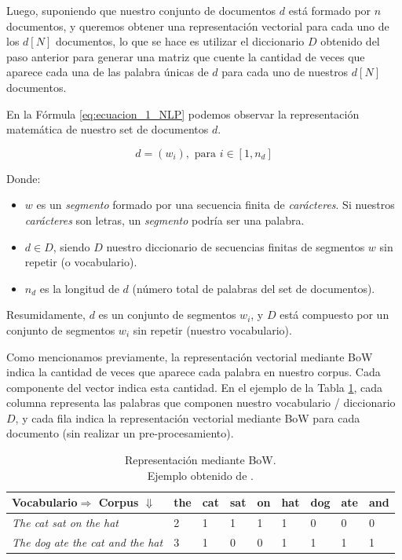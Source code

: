 \documentclass[12pt,a4paper]{article}
\begin{document}
\begin{sloppypar}
Luego, suponiendo que nuestro conjunto de documentos $d$ está formado por $n$ documentos, y queremos obtener una representación vectorial para cada uno de los $d[N]$ documentos, lo que se hace es utilizar el diccionario $D$ obtenido del paso anterior para generar una matriz que cuente la cantidad de veces que aparece cada una de las palabra únicas de $d$ para cada uno de nuestros $d[N]$ documentos.

En la Fórmula \ref{eq:ecuacion_1_NLP} podemos observar la representación matemática de nuestro set de documentos $d$.

\begin{equation}\label{eq:ecuacion_1_NLP}
d = (w_i),      \text{    para  } i\in[1,n_d] 
\end{equation}

Donde:
\begin{itemize}
\item $w$ es un \textit{segmento} formado por una secuencia finita de \textit{carácteres}. Si nuestros \textit{carácteres} son letras, un \textit{segmento} podría ser una palabra.
\item $d \in D$, siendo $D$ nuestro diccionario de secuencias finitas de segmentos $w$ sin repetir (o vocabulario). 
\item $n_d$ es la longitud de $d$ (número total de palabras del set de documentos).
\end{itemize}

Resumidamente, $d$ es un conjunto de segmentos $w_i$, y $D$ está compuesto por un conjunto de segmentos $w_i$ sin repetir (nuestro vocabulario).

\cleardoublepage

Como mencionamos previamente, la representación vectorial mediante BoW indica la cantidad de veces que aparece cada palabra en nuestro corpus. Cada componente del vector indica esta cantidad. En el ejemplo de la Tabla \ref{table:bow_1}, cada columna representa las palabras que componen nuestro vocabulario / diccionario $D$, y cada fila indica la representación vectorial mediante BoW para cada documento (sin realizar un pre-procesamiento).

\begin{table}[h!]
\centering
\begin{tabular}{|p{4cm}||p{1cm}|p{1cm}|p{1cm}|p{1cm}|p{1cm}|p{1cm}|p{1cm}|p{1cm}|}
\hline
\textbf{Vocabulario$\Rightarrow$ Corpus $\Downarrow$} & the & cat & sat & on & hat & dog & ate & and \\ [1ex] 
\hline
\textit{The cat sat on the hat} & 2 & 1 & 1 & 1 & 1 & 0 & 0 & 0 \\ 
\hline
\textit{The dog ate the cat and the hat} & 3 & 1 & 0 & 0 & 1 & 1 & 1 & 1 \\ 
\hline
\end{tabular}
\caption{Representación mediante BoW. \\ Ejemplo obtenido de \cite{NLP_8}.} 
\label{table:bow_1}
\end{table}


\end{sloppypar}
\end{document}
